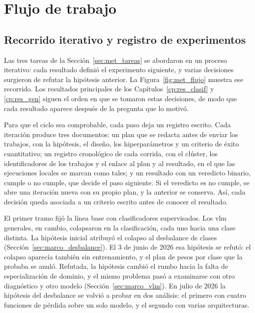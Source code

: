 
\section{Flujo de trabajo}
\label{sec:met_metodologia}

\subsection{Recorrido iterativo y registro de experimentos}

Las tres tareas de la Sección~\ref{sec:met_tareas} se abordaron en un proceso iterativo: cada resultado definió el
experimento siguiente, y varias decisiones surgieron de refutar la hipótesis anterior. La Figura~\ref{fig:met_flujo}
muestra ese recorrido. Los resultados principales de los Capítulos~\ref{cp:res_clasif} y \ref{cp:res_gen} siguen el
orden en que se tomaron estas decisiones, de modo que cada resultado aparece después de la pregunta que lo motivó.



Para que el ciclo sea comprobable, cada paso deja un registro escrito. Cada iteración produce tres documentos: un
plan que se redacta antes de enviar los trabajos, con la hipótesis, el diseño, los hiperparámetros y un criterio de
éxito cuantitativo; un registro cronológico de cada corrida, con el clúster, los identificadores de los trabajos y el
enlace al plan y al resultado, en el que las ejecuciones locales se marcan como tales; y un resultado con un veredicto
binario, cumple o no cumple, que decide el paso siguiente. Si el veredicto es no cumple, se abre una iteración nueva
con su propio plan, y la anterior se conserva. Así, cada decisión queda asociada a un criterio escrito antes de
conocer el resultado.

El primer tramo fijó la línea base con clasificadores supervisados. Los \gls{vlm} generales, en cambio, colapsaron en
la clasificación, cada uno hacia una clase distinta. La hipótesis inicial atribuyó el colapso al desbalance de clases
(Sección~\ref{sec:marco_desbalance}). El 3 de junio de 2026 esa hipótesis se refutó: el colapso aparecía también sin
entrenamiento, y el plan de pesos por clase que la probaba se anuló. Refutada, la hipótesis cambió el rumbo hacia la
falta de especialización de dominio, y el mismo problema pasó a examinarse con otro diagnóstico y otro modelo
(Sección~\ref{sec:marco_vlm}). En julio de 2026 la hipótesis del desbalance se volvió a probar en dos análisis: el
primero con cuatro funciones de pérdida sobre un solo modelo, y el segundo con varias arquitecturas.

